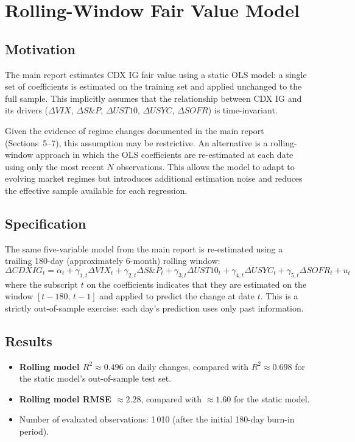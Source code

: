 \section{Rolling-Window Fair Value Model}

\subsection*{Motivation}

The main report estimates CDX IG fair value using a static OLS model: a single
set of coefficients is estimated on the training set and applied unchanged to
the full sample. This implicitly assumes that the relationship between CDX IG
and its drivers (\(\Delta VIX\), \(\Delta S\&P\), \(\Delta UST10\),
\(\Delta USYC\), \(\Delta SOFR\)) is time-invariant.

Given the evidence of regime changes documented in the main report
(Sections~5--7), this assumption may be restrictive. An alternative is a
rolling-window approach in which the OLS coefficients are re-estimated at each
date using only the most recent \(N\) observations. This allows the model to
adapt to evolving market regimes but introduces additional estimation noise and
reduces the effective sample available for each regression.

\subsection*{Specification}

The same five-variable model from the main report is re-estimated using a
trailing 180-day (approximately 6-month) rolling window:
\[
\Delta CDXIG_t = \alpha_t + \gamma_{1,t} \Delta VIX_t + \gamma_{2,t} \Delta S\&P_t
  + \gamma_{3,t} \Delta UST10_t + \gamma_{4,t} \Delta USYC_t
  + \gamma_{5,t} \Delta SOFR_t + u_t
\]
where the subscript \(t\) on the coefficients indicates that they are estimated
on the window \([t - 180, \, t - 1]\) and applied to predict the change at
date \(t\). This is a strictly out-of-sample exercise: each day's prediction
uses only past information.

\subsection*{Results}

\begin{itemize}
  \item \textbf{Rolling model \(R^2 \approx 0.496\)} on daily changes, compared
    with \(R^2 \approx 0.698\) for the static model's out-of-sample test set.
  \item \textbf{Rolling model RMSE \(\approx 2.28\)}, compared with
    \(\approx 1.60\) for the static model.
  \item Number of evaluated observations: 1\,010 (after the initial 180-day
    burn-in period).
\end{itemize}

